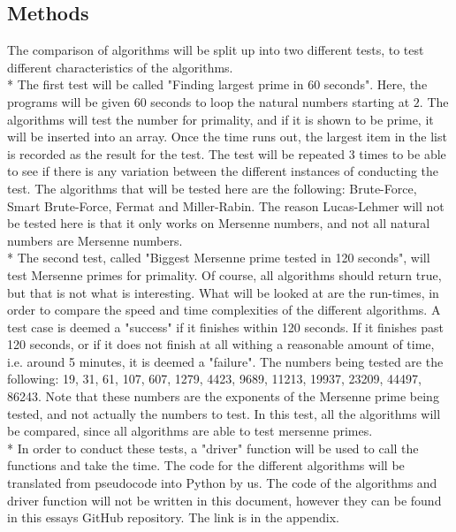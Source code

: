 \documentclass[main.tex]{subfiles}
\begin{document}
\subsection{Methods}
The comparison of algorithms will be split up into two different tests, to test different characteristics of the algorithms. 
\newline
\\*
The first test will be called "Finding largest prime in 60 seconds". Here, the programs will be given 60 seconds to loop the natural numbers starting at $2$. The algorithms will test the number for primality, and if it is shown to be prime, it will be inserted into an array. Once the time runs out, the largest item in the list is recorded as the result for the test. The test will be repeated 3 times to be able to see if there is any variation between the different instances of conducting the test. The algorithms that will be tested here are the following: Brute-Force, Smart Brute-Force, Fermat and Miller-Rabin. The reason Lucas-Lehmer will not be tested here is that it only works on Mersenne numbers, and not all natural numbers are Mersenne numbers. 
\newline
\\*
The second test, called "Biggest Mersenne prime tested in 120 seconds", will test Mersenne primes for primality. Of course, all algorithms should return true, but that is not what is interesting. What will be looked at are the run-times, in order to compare the speed and time complexities of the different algorithms. A test case is deemed a "success" if it finishes within 120 seconds. If it finishes past 120 seconds, or if it does not finish at all withing a reasonable amount of time, i.e. around 5 minutes, it is deemed a "failure". The numbers being tested are the following: 19, 31, 61, 107, 607, 1279, 4423, 9689, 11213, 19937, 23209, 44497, 86243. Note that these numbers are the exponents of the Mersenne prime being tested, and not actually the numbers to test. In this test, all the algorithms will be compared, since all algorithms are able to test mersenne primes. 
\newline
\\*
In order to conduct these tests, a "driver" function will be used to call the functions and take the time. The code for the different algorithms will be translated from pseudocode into Python by us. The code of the algorithms and driver function will not be written in this document, however they can be found in this essays GitHub repository. The link is in the appendix. 
\end{document}
